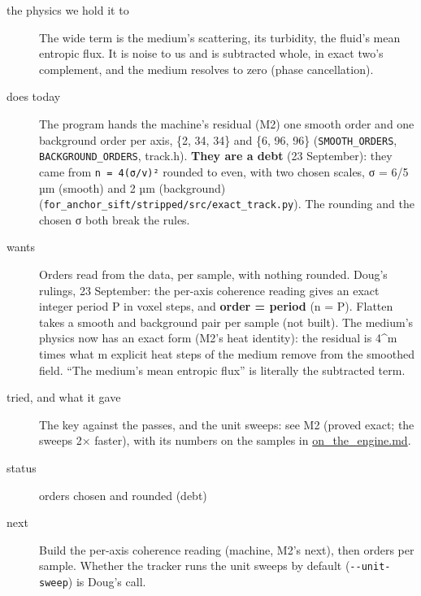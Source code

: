 \begin{description}
\item[{the physics we hold it to}] The wide term is the medium's scattering, its turbidity, the fluid's mean entropic flux. It is noise to us and is subtracted whole, in exact two's complement, and the medium resolves to zero (phase cancellation).
\item[{does today}] The program hands the machine's residual (M2) one smooth order and one background order per axis, \{2, 34, 34\} and \{6, 96, 96\} (\texttt{SMOOTH\_\allowbreak{}ORDERS}, \texttt{BACKGROUND\_\allowbreak{}ORDERS}, track.h). \textbf{They are a debt} (23 September): they came from \texttt{n = 4(σ/\allowbreak{}v)²} rounded to even, with two chosen scales, σ = 6/5 µm (smooth) and 2 µm (background) (\texttt{for\_\allowbreak{}anchor\_\allowbreak{}sift/\allowbreak{}stripped/\allowbreak{}src/\allowbreak{}exact\_\allowbreak{}track.\allowbreak{}py}). The rounding and the chosen σ both break the rules.
\item[{wants}] Orders read from the data, per sample, with nothing rounded. Doug's rulings, 23 September: the per-axis coherence reading gives an exact integer period P in voxel steps, and \textbf{order = period} (n = P). Flatten takes a smooth and background pair per sample (not built). The medium's physics now has an exact form (M2's heat identity): the residual is 4\textasciicircum{}m times what m explicit heat steps of the medium remove from the smoothed field. “The medium's mean entropic flux” is literally the subtracted term.
\item[{tried, and what it gave}] The key against the passes, and the unit sweeps: see M2 (proved exact; the sweeps 2× faster), with its numbers on the samples in \hyperref[chap:on-the-engine]{on\_\allowbreak{}the\_\allowbreak{}engine.md}.
\item[{status}] orders chosen and rounded (debt)
\item[{next}] Build the per-axis coherence reading (machine, M2's next), then orders per sample. Whether the tracker runs the unit sweeps by default (\texttt{-\allowbreak{}-\allowbreak{}unit-\allowbreak{}sweep}) is Doug's call.
\end{description}

